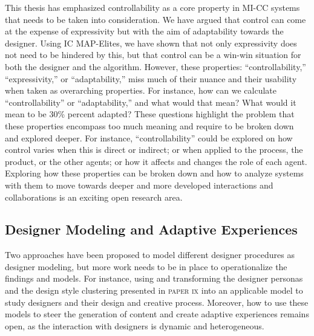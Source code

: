 This thesis has emphasized controllability as a core property in MI-CC systems that needs to be taken into consideration. We have argued that control can come at the expense of expressivity but with the aim of adaptability towards the designer. Using IC MAP-Elites, we have shown that not only expressivity does not need to be hindered by this, but that control can be a win-win situation for both the designer and the algorithm. However, these properties: ``controllability,'' ``expressivity,'' or ``adaptability,'' miss much of their nuance and their usability when taken as overarching properties. For instance, how can we calculate ``controllability'' or ``adaptability,'' and what would that mean? What would it mean to be 30\% percent adapted? These questions highlight the problem that these properties encompass too much meaning and require to be broken down and explored deeper. For instance, ``controllability'' could be explored on how control varies when this is direct or indirect; or when applied to the process, the product, or the other agents; or how it affects and changes the role of each agent. Exploring how these properties can be broken down and how to analyze systems with them to move towards deeper and more developed interactions and collaborations is an exciting open research area.



\subsection{Designer Modeling and Adaptive Experiences}


Two approaches have been proposed to model different designer procedures as designer modeling, but more work needs to be in place to operationalize the findings and models. For instance, using and transforming the designer personas and the design style clustering
presented in \textsc{paper ix} into an applicable model to study designers and their design and creative process. Moreover, how to use these models to steer the generation of content and create adaptive experiences remains open, as the interaction with designers is dynamic and heterogeneous.

